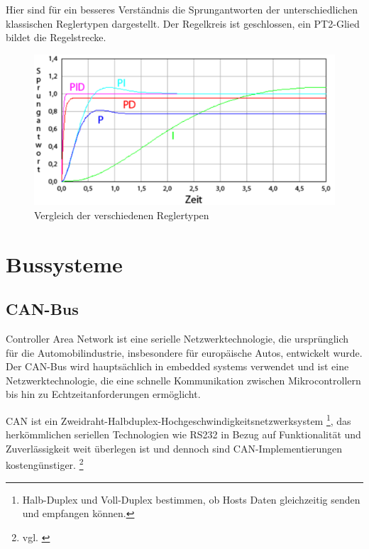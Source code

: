 \vspace{5mm}
Hier sind für ein besseres Verständnis die Sprungantworten der unterschiedlichen klassischen Reglertypen dargestellt. Der Regelkreis ist geschlossen, ein PT2-Glied bildet die Regelstrecke.
\\[4mm]
\begin{figure}[H]
	\begin{center}
		\includegraphics[scale=0.3]{figures/antrieb/Reglertypen.png}
		\caption{Vergleich der verschiedenen Reglertypen\cite{PID-Regler}}
	\end{center}
\end{figure}

\newpage



\section{Bussysteme}

\subsection{CAN-Bus}

Controller Area Network ist eine serielle Netzwerktechnologie, die ursprünglich für die Automobilindustrie, insbesondere für europäische Autos, entwickelt wurde. Der CAN-Bus wird hauptsächlich in embedded systems verwendet und ist eine Netzwerktechnologie, die eine schnelle Kommunikation zwischen Mikrocontrollern bis hin zu Echtzeitanforderungen ermöglicht. \\ \medskip

CAN ist ein Zweidraht-Halbduplex-Hochgeschwindigkeitsnetzwerksystem \footnote{Halb-Duplex und Voll-Duplex bestimmen, ob Hosts Daten gleichzeitig senden und empfangen können.}, das herkömmlichen seriellen Technologien wie RS232 in Bezug auf Funktionalität und Zuverlässigkeit weit überlegen ist und dennoch sind CAN-Implementierungen kostengünstiger. \footnote{vgl. \cite{can}}

